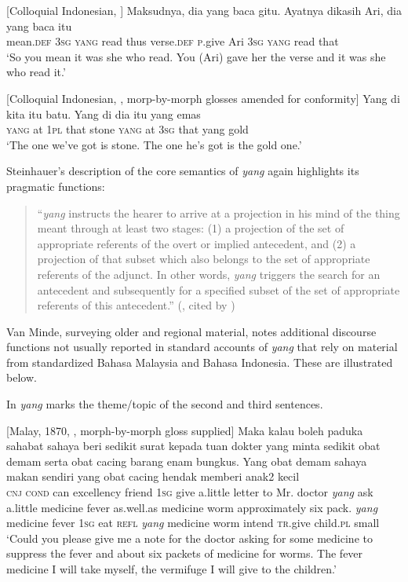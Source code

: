 \ea\label{smith:ex:64}
{}[Colloquial Indonesian, \citet[13-14]{Englebretson2008}]
\gll Maksudnya, dia yang baca gitu. Ayatnya dikasih Ari, dia yang baca itu\\
mean.\textsc{def} 3\textsc{sg} \textsc{yang} read thus verse.\textsc{def} \textsc{p}.give Ari 3\textsc{sg} \textsc{yang} read that\\
`So you mean it was she who read. You (Ari) gave her the verse and it was she who read it.'
\z

\ea\label{smith:ex:65}
{}[Colloquial Indonesian, \citet[16]{Englebretson2008}, morp-by-morph glosses amended for conformity]
\gll Yang di kita itu batu. Yang di dia itu yang emas\\
\textsc{yang} at 1\textsc{pl} that stone \textsc{yang} at 3\textsc{sg} that yang gold\\
`The one we've got is stone. The one he's got is the gold one.'
\z

Steinhauer's description of the core semantics of \textit{yang } again highlights its pragmatic functions: 

\begin{quote}
``\textit{yang} instructs the hearer to arrive at a projection in his mind of the thing meant through at least two stages: (1) a projection of the set of appropriate referents of the overt or implied antecedent, and (2) a projection of that subset which also belongs to the set of appropriate referents of the adjunct. In other words, \textit{yang} triggers the search for an antecedent and subsequently for a specified subset of the set of appropriate referents of this antecedent.'' (\citet[430-1]{Steinhauer1992}, cited by \citet[1987]{vanMinde2008})
\end{quote}

Van Minde, surveying older and regional material, notes additional discourse functions not usually reported in standard accounts of \textit{yang} that rely on material from standardized Bahasa Malaysia and Bahasa Indonesia. These are illustrated below. 

In  \textit{yang }marks the theme/topic of the second and third sentences.

\ea\label{smith:ex:66}
{}[Malay, 1870, \citep[1994-5]{vanMinde2008}, morph-by-morph gloss supplied]
\gll Maka kalau boleh paduka sahabat sahaya beri sedikit surat kepada tuan dokter yang minta sedikit obat demam serta obat cacing barang enam bungkus. Yang obat demam sahaya makan sendiri yang obat cacing hendak memberi anak2 kecil \\
\textsc{cnj} \textsc{cond} can excellency friend 1\textsc{sg} give a.little letter to Mr. doctor \textit{yang} ask a.little medicine fever as.well.as medicine worm approximately six pack. \textit{yang} medicine fever 1\textsc{sg} eat \textsc{refl} \textit{yang} medicine worm intend \textsc{tr}.give child.\textsc{pl} small\\
`Could you please give me a note for the doctor asking for some medicine to suppress the fever and about six packets of medicine for worms. The fever medicine I will take myself, the vermifuge I will give to the children.'
\z

